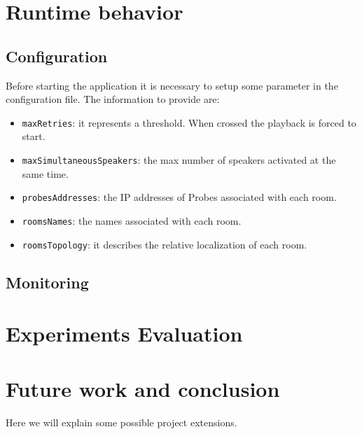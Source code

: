 \documentclass[conference]{./IEEEtran}
\begin{document}


\section{Runtime behavior}

\subsection{Configuration}
Before starting the application it is necessary to setup some parameter in the configuration file. The information to provide are:
\begin{itemize}
\item \texttt{maxRetries}: it represents a threshold. When crossed the playback is forced to start. 
\item \texttt{maxSimultaneousSpeakers}: the max number of speakers activated at the same time.
\item \texttt{probesAddresses}: the IP addresses of Probes associated with each room.
\item \texttt{roomsNames}: the names associated with each room.
\item \texttt{roomsTopology}: it describes the relative localization of each room. %
\end{itemize}

\subsection{Monitoring}


\section{Experiments Evaluation}

\section{Future work and conclusion}
Here we will explain some possible project extensions. 
\end{document}
